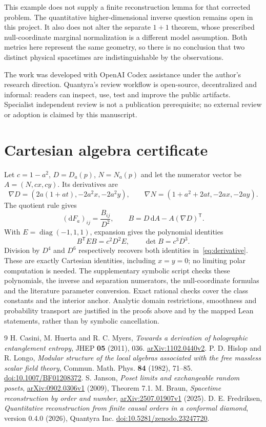 \documentclass[11pt]{article}
\theoremstyle{remark}
\newcommand{\dd}{\mathrm d}
\begin{document}
This example does not supply a finite reconstruction lemma for that
corrected problem. The quantitative higher-dimensional inverse question
remains open in this project. It also does not alter the separate
$1+1$ theorem, whose prescribed null-coordinate marginal normalization
is a different model assumption. Both metrics here represent the same
geometry, so there is no conclusion that two distinct physical spacetimes
are indistinguishable by the observations.

The work was developed with OpenAI Codex assistance under the author's
research direction. Quantyra's review workflow is open-source,
decentralized and informal: readers can inspect, use, test and improve
the public artifacts. Specialist independent review is not a publication
prerequisite; no external review or adoption is claimed by this manuscript.

\appendix
\section{Cartesian algebra certificate}\label{app:algebra}
Let $c=1-a^2$, $D=D_a(p)$, $N=N_a(p)$ and let the numerator vector be
$A=(N,cx,cy)$. Its derivatives are
\[
 \nabla D=(2a(1+at),-2a^2x,-2a^2y),\qquad
 \nabla N=(1+a^2+2at,-2ax,-2ay).
\]
The quotient rule gives
\[
 (\dd F_a)_{ij}=\frac{B_{ij}}{D^2},\qquad
 B=D\,\dd A-A(\nabla D)^{\mathsf T}.
\]
With $E=\operatorname{diag}(-1,1,1)$, expansion gives the polynomial
identities
\[
 B^{\mathsf T}EB=c^2D^2E,\qquad \det B=c^3D^3.
\]
Division by $D^4$ and $D^6$ respectively recovers both identities
in~\eqref{eq:derivative}. These are exactly Cartesian identities,
including $x=y=0$; no limiting polar computation is needed.
The supplementary symbolic script checks these polynomials, the
inverse and separation numerators, the null-coordinate formulas and
the literature parameter conversion. Exact rational checks cover the
class constants and the interior anchor. Analytic domain restrictions,
smoothness and probability transport are justified in the proofs above
and by the mapped Lean statements, rather than by symbolic cancellation.

\begin{thebibliography}{9}
 H. Casini, M. Huerta and R. C. Myers,
\emph{Towards a derivation of holographic entanglement entropy},
JHEP \textbf{05} (2011), 036.
\href{https://arxiv.org/abs/1102.0440v2}{arXiv:1102.0440v2}.
 P. D. Hislop and R. Longo,
\emph{Modular structure of the local algebras associated with the free
massless scalar field theory}, Commun. Math. Phys. \textbf{84} (1982),
71--85. \href{https://doi.org/10.1007/BF01208372}{doi:10.1007/BF01208372}.
 S. Janson,
\emph{Poset limits and exchangeable random posets},
\href{https://arxiv.org/abs/0902.0306v1}{arXiv:0902.0306v1} (2009),
Theorem 7.1.
 M. Braun,
\emph{Spacetime reconstruction by order and number},
\href{https://arxiv.org/abs/2507.01907v1}{arXiv:2507.01907v1} (2025).
 D. E. Fredriksen,
\emph{Quantitative reconstruction from finite causal orders in a conformal
diamond}, version 0.4.0 (2026), Quantyra Inc.
\href{https://doi.org/10.5281/zenodo.23247720}{doi:10.5281/zenodo.23247720}.
\end{thebibliography}
\end{document}
